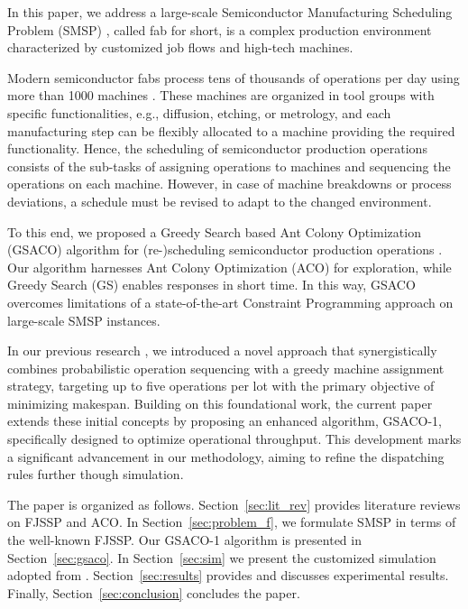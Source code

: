 \documentclass[runningheads]{llncs}
\begin{document}
In this paper, we address a large-scale Semiconductor Manufacturing Scheduling Problem (SMSP) \cite{kopp2020smt2020}, called fab for short, is a complex production environment characterized by customized job flows and high-tech machines.

Modern semiconductor fabs process tens of thousands of operations per day using more than 1000 machines \cite{kopp2020smt2020}.
These machines are organized in tool groups with specific functionalities,
e.g., diffusion, etching, or metrology,
and each manufacturing step can be flexibly allocated to a machine 
providing the required functionality.
Hence, the scheduling of semiconductor production operations consists of the
sub-tasks of assigning operations to machines and sequencing the operations on each machine.
However, in case of machine breakdowns or process deviations,
a schedule must be revised to adapt to the changed environment.

To this end, we proposed a Greedy Search based Ant Colony Optimization (GSACO)
algorithm for (re-)scheduling semiconductor production operations \cite{Ali2024}. 
Our algorithm harnesses Ant Colony Optimization (ACO) \cite{Dorigo2019} for exploration, while
Greedy Search (GS) \cite{Papadimitriou} enables responses in short time. 
In this way,
GSACO overcomes limitations of a
state-of-the-art Constraint Programming approach \cite{Perron2023}
on large-scale SMSP %
instances. 

In our previous research \cite{Ali2024}, we introduced a novel approach that synergistically combines probabilistic operation sequencing with a greedy machine assignment strategy, targeting up to five operations per lot with the primary objective of minimizing makespan. Building on this foundational work, the current paper extends these initial concepts by proposing an enhanced algorithm, GSACO-1, specifically designed to optimize operational throughput. This development marks a significant advancement in our methodology, aiming to refine the dispatching rules further though simulation.

The paper is organized as follows. 
Section~\ref{sec:lit_rev} provides literature reviews on FJSSP and ACO.
In Section~\ref{sec:problem_f}, we formulate SMSP in terms of the well-known FJSSP. 
Our GSACO-1 algorithm is presented in Section~\ref{sec:gsaco}.
In Section~\ref{sec:sim} we present the customized simulation adopted from \cite{Kovács2022}.
Section~\ref{sec:results} provides and discusses experimental results.
Finally, Section~\ref{sec:conclusion} concludes the paper.
\end{document}
